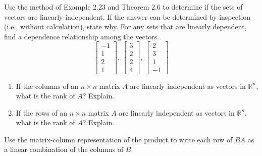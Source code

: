 \documentclass[12pt,letterpaper]{hmcpset}
\begin{document}
\begin{solution}
\vfill
\end{solution}
\newpage

\begin{problem}[2.2.28]

Use the method of Example 2.23 and Theorem 2.6 to determine if the sets of vectors are linearly independent. If the answer can be determined by inspection (i.e., without calculation), state why. For any sets that are linearly dependent, find a dependence relationship among the vectors.$$\begin{bmatrix}
	-1\\
	1\\
	2\\
	1
\end{bmatrix}\text{, }\begin{bmatrix}
	3\\
	2\\
	2\\
	4
\end{bmatrix}\text{, }\begin{bmatrix}
	2\\
	3\\
	1\\
	-1
\end{bmatrix}$$

\end{problem}

\begin{solution}
\vfill
\end{solution}
\newpage

\begin{problem}[2.3.42]

\begin{enumerate}
	\item
		If the columns of an $n \times n$ matrix $A$ are linearly independent as vectors in $\mathbb{R}^n$, what is the rank of $A$? Explain.
	\item
		If the rows of an $n \times n$ matrix $A$ are linearly independent as vectors in $\mathbb{R}^n$, what is the rank of $A$? Explain.
\end{enumerate}

\end{problem}

\begin{solution}
\vfill
\end{solution}
\newpage

\begin{problem}[3.1.26]

Use the matrix-column representation of the product to write each row of $BA$ as a linear combination of the columns of $B$.

\end{problem}
\end{document}
